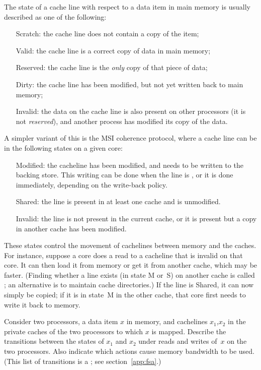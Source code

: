 The state of a cache line with respect to a data item in main memory
is usually described as one of the following:
\begin{itemize}
\item[Scratch:] the cache line does not contain a copy of the item;
\item[Valid:] the cache line is a correct copy of data in main memory;
\item[Reserved:] the cache line is the \emph{only} copy of that piece
  of data;
\item[Dirty:] the cache line has been modified, but not yet written
  back to main memory;
\item [Invalid:] the data on the cache line is also present on other
  processors (it is not \emph{reserved}), and another process has
  modified its copy of the data.
\end{itemize}

A simpler variant of this is the \acf{MSI} coherence protocol, where a
cache line can be in the following states on a given core:
\begin{itemize}
\item [Modified:] the cacheline has been modified, and needs to be
  written to the backing store. This writing can be done when the line
  is , or it is done immediately, depending on the
  write-back policy.
\item [Shared:] the line is present in at least one cache and is unmodified.
\item [Invalid:] the line is not present in the current cache, or it
  is present but a copy in another cache has been modified.
\end{itemize}

These states control the movement of cachelines between memory and the
caches. For instance, suppose a core does a read to a cacheline that
is invalid on that core. It can then load it from memory or get it
from another cache, which may be faster. (Finding whether a line exists
(in state M or~S) on another cache is called ; an alternative
is to maintain cache directories.) If
the line is Shared, it can now simply be copied; if it is in state~M in
the other cache, that core first needs to write it back to memory.

\begin{exercise}
  Consider two processors, a data item $x$ in memory, and cachelines
  $x_1$,$x_2$ in the private caches of the two processors to which $x$
  is mapped. Describe the transitions between the states of $x_1$ and
  $x_2$ under reads and writes of~$x$ on the two processors. Also
  indicate which actions cause memory bandwidth to be used. (This list
  of transitions is a ; see section~\ref{app:fsa}.)
\end{exercise}

